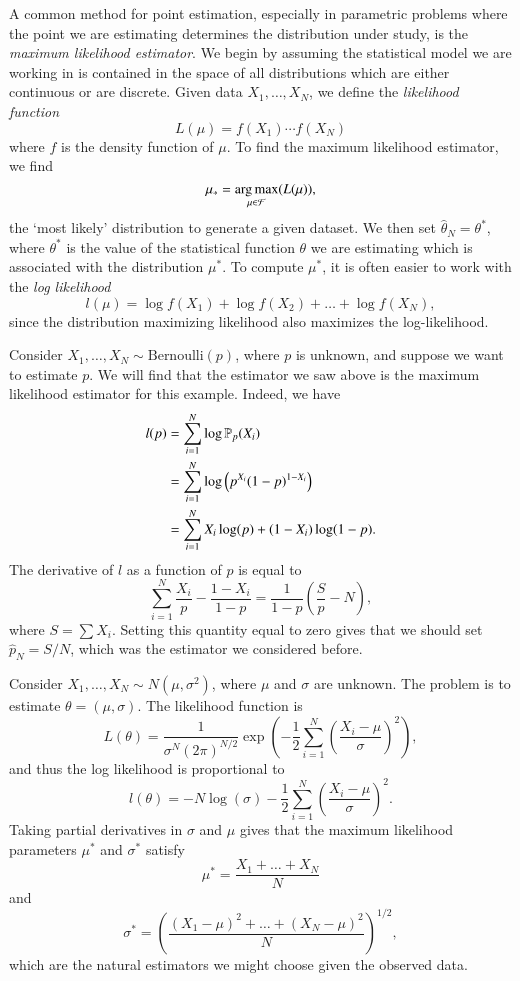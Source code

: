 A common method for point estimation, especially in parametric problems where the point we are estimating determines the distribution under study, is the \emph{maximum likelihood estimator}. We begin by assuming the statistical model we are working in is contained in the space of all distributions which are either continuous or are discrete. Given data $X_1,\dots,X_N$, we define the \emph{likelihood function}
%
\[ L(\mu) = f(X_1) \cdots f(X_N) \]
%
where $f$ is the density function of $\mu$. To find the maximum likelihood estimator, we find
%
\[ \mu_* = \operatorname*{arg\,max}_{\mu \in \mathcal{F}}(L(\mu)), \]
%
the `most likely' distribution to generate a given dataset. We then set $\widehat{\theta}_N = \theta^*$, where $\theta^*$ is the value of the statistical function $\theta$ we are estimating which is associated with the distribution $\mu^*$. To compute $\mu^*$, it is often easier to work with the \emph{log likelihood}
%
\[ l(\mu) = \log f(X_1) + \log f(X_2) + \dots + \log f(X_N), \]
%
since the distribution maximizing likelihood also maximizes the log-likelihood.

\begin{example}
	Consider $X_1,\dots,X_N \sim \text{Bernoulli}(p)$, where $p$ is unknown, and suppose we want to estimate $p$. We will find that the estimator we saw above is the maximum likelihood estimator for this example. Indeed, we have
	\begin{align*}
		l(p) &= \sum_{i = 1}^N \log \operatorname{\mathbb{P}}_p(X_i)\\
		&= \sum_{i = 1}^N \log \left( p^{X_i} (1 - p)^{1 - X_i} \right)\\
		&= \sum_{i = 1}^N X_i \log(p) + (1 - X_i) \log(1 - p).
	\end{align*}
	The derivative of $l$ as a function of $p$ is equal to
	\[ \sum_{i = 1}^N \frac{X_i}{p} - \frac{1 - X_i}{1 - p} = \frac{1}{1 - p} \left( \frac{S}{p} - N \right), \]
	where $S = \sum X_i$. Setting this quantity equal to zero gives that we should set $\widehat{p}_N = S/N$, which was the estimator we considered before.
\end{example}

\begin{example}
	Consider $X_1,\dots,X_N \sim N(\mu,\sigma^2)$, where $\mu$ and $\sigma$ are unknown. The problem is to estimate $\theta = (\mu,\sigma)$. The likelihood function is
	\[ L(\theta) = \frac{1}{\sigma^N (2 \pi)^{N/2}} \exp \left( - \frac{1}{2} \sum_{i = 1}^N \left( \frac{X_i - \mu}{\sigma} \right)^2 \right), \]
	and thus the log likelihood is proportional to
	\[ l(\theta) = -N \log(\sigma) - \frac{1}{2} \sum_{i = 1}^N \left( \frac{X_i - \mu}{\sigma} \right)^2. \]
	Taking partial derivatives in $\sigma$ and $\mu$ gives that the maximum likelihood parameters $\mu^*$ and $\sigma^*$ satisfy
	\[ \mu^* = \frac{X_1 + \dots + X_N}{N} \]
	and
	\[ \sigma^* = \left( \frac{(X_1 - \mu)^2 + \dots + (X_N - \mu)^2}{N} \right)^{1/2}, \]
	which are the natural estimators we might choose given the observed data.
\end{example}

